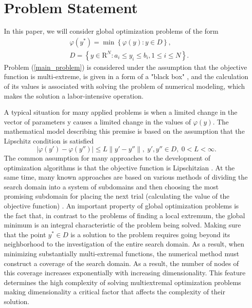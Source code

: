 \documentclass[entropy,article,submit,moreauthors,pdftex]{Definitions/mdpi}
\begin{document}
\section{Problem Statement}

In this paper, we will consider global optimization problems of the form
\begin{eqnarray}\label{main_problem}
& \varphi(y^\ast)=\min{\left\{\varphi(y):y\in D\right\}},\\
& D=\left\{y\in \text{R}^N: a_i\leq y_i \leq b_i, 1\leq i \leq N\right\}. \nonumber
\end{eqnarray}
Problem (\ref{main_problem}) is considered under the assumption that the objective function is multi-extreme, is given in a form of a "black box" , and the calculation of its values is associated with solving the problem of numerical modeling, which makes the solution a labor-intensive operation.

A typical situation for many applied problems is when a limited change in the vector of parameters y causes a limited change in the values of $\varphi(y)$. The mathematical model describing this premise is based on the assumption that the Lipschitz condition is satisfied
\[
\left|\varphi(y')-\varphi(y'')\right|\leq L\left\|y'-y''\right\|,\; y',y'' \in D,\; 0<L<\infty.
\]
The common assumption for many approaches to the development of optimization algorithms is that the objective function is Lipschitzian  \cite{Jones1993,Pinter1996,Zilinskas2008,Evtushenko2009}.
At the same time, many known approaches are based on various methods of dividing the search domain into a system of subdomains and then choosing the most promising subdomain for placing the next trial (calculating the value of the objective function)  \cite{Jones2009,Zilinskas2010,Evtushenko2013,Kvasov2013,Paulavicius2016}. 
An important property of global optimization problems is the fact that, in contrast to the problems of finding a local extremum, the global minimum is an integral characteristic of the problem being solved. Making sure that the point  $y^*\in D$ is a solution to the problem requires going beyond its neighborhood to the investigation of the entire search domain. As a result, when minimizing substantially multi-extremal functions, the numerical method must construct a coverage of the search domain. As a result, the number of nodes of this coverage increases exponentially with increasing dimensionality. 
This feature determines the high complexity of solving multiextremal optimization problems making dimensionality a critical factor that affects the complexity of their solution.
\end{document}
